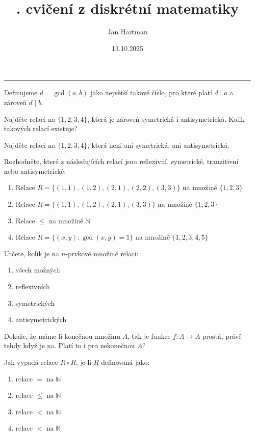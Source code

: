 \documentclass[10pt]{article}
\title{\tutnum. cvičení z diskrétní matematiky}
\author{Jan Hartman}
\date{13.10.2025}
\newcommand{\titlerule}{%
    \noindent %
    \makebox[\textwidth]{\large \thetitle \hfill \thedate}
    \rule{\textwidth}{0.4pt}%
}
\begin{document}
\titlerule

\begin{defn}
Definujeme $d = \gcd(a,b)$ jako největší takové číslo, pro které platí $d \mid a$ a zároveň $d \mid b$.
\end{defn}

\begin{problem}
Najděte relaci na $\{1,2,3,4\}$, která je zároveň symetrická i antisymetrická. Kolik takových relací existuje?
\end{problem}

\begin{problem}
Najděte relaci na $\{1,2,3,4\}$, která není ani symetrická, ani antisymetrická.
\end{problem}

\begin{problem}
Rozhodněte, které z následujících relací jsou reflexivní, symetrické, tranzitivní nebo antisymetrické:
\begin{enumerate}[label=(\alph*)]
    \item Relace $R=\{(1,1),(1,2),(2,1),(2,2),(3,3)\}$ na množině $\{1,2,3\}$
    \item Relace $R=\{(1,1),(1,2),(2,1),(3,3)\}$ na množině $\{1,2,3\}$
    \item Relace $\leq$ na množině $\mathbb{N}$
    \item Relace $R = \{ (x,y) : \gcd(x,y) = 1 \}$ na množině $\{1,2,3,4,5\}$
\end{enumerate}
\end{problem}

\begin{problem}
Určete, kolik je na $n$-prvkové množině relací:
\begin{enumerate}[label=(\alph*)]
    \item všech možných
    \item reflexivních
    \item symetrických
    \item antisymetrických
\end{enumerate}
\end{problem}

\begin{problem}
Dokaže, že máme-li konečnou množinu $A$, tak je funkce $f : A \rightarrow A$ prostá, právě tehdy když je na. Platí to i pro nekonečnou $A$?
\end{problem}

\begin{problem}
Jak vypadá relace $R \circ R$, je-li $R$ definovaná jako:
\begin{enumerate}[label=(\alph*)]
    \item relace $=$ na $\mathbb{N}$
    \item relace $\leq$ na $\mathbb{N}$
    \item relace $<$ na $\mathbb{N}$
    \item relace $<$ na $\mathbb{R}$
\end{enumerate}
\end{problem}
\end{document}
